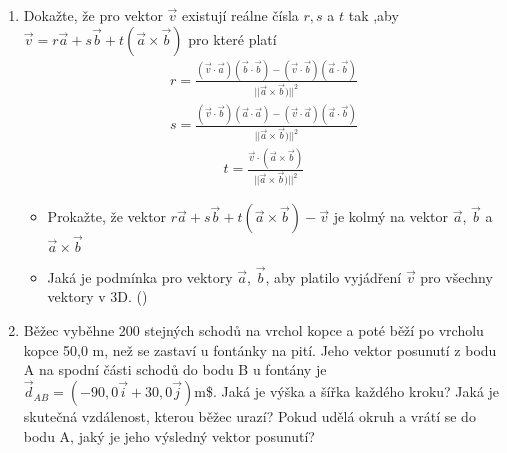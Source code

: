 \documentclass[letterpaper,10pt,english]{jupyterBook}
\begin{document}
{{\begin{enumerate}
\begin{itemize}
\end{itemize}

\item {} 
\sphinxAtStartPar
Dokažte, že pro vektor \(\vec{v}\) existují reálne čísla \(r,s\) a \(t\) tak ,aby \(\vec{v} = r \vec{a} + s \vec{b} + t (\vec{a}\times \vec{b})\) pro které platí
\begin{equation*}
\begin{split}r = \frac{(\vec{v}\cdot\vec{a})(\vec{b}\cdot\vec{b}) - (\vec{v}\cdot\vec{b})(\vec{a}\cdot\vec{b})}{||\vec{a}\times\vec{b}) ||^2}\end{split}
\end{equation*}\begin{equation*}
\begin{split}s = \frac{(\vec{v}\cdot\vec{b})(\vec{a}\cdot\vec{a}) - (\vec{v}\cdot\vec{a})(\vec{a}\cdot\vec{b})}{||\vec{a}\times\vec{b}) ||^2}\end{split}
\end{equation*}\begin{equation*}
\begin{split}t = \frac{\vec{v}\cdot(\vec{a}\times\vec{b})}{||\vec{a}\times\vec{b}) ||^2}\end{split}
\end{equation*}\begin{itemize}
\item {} 
\sphinxAtStartPar
Prokažte, že vektor \(r \vec{a} + s \vec{b} + t (\vec{a}\times \vec{b})- \vec{v}\) je kolmý na vektor \(\vec{a}\), \(\vec{b}\) a \(\vec{a}\times \vec{b}\)

\item {} 
\sphinxAtStartPar
Jaká je podmínka pro vektory \(\vec{a}\), \(\vec{b}\), aby platilo vyjádření \(\vec{v}\) pro všechny vektory v 3D.  ()

\end{itemize}

\item {} 
\sphinxAtStartPar
Běžec vyběhne 200 stejných schodů na vrchol kopce a poté běží po vrcholu kopce 50,0 m, než se zastaví u fontánky na pití. Jeho vektor posunutí z bodu A na spodní části schodů do bodu B u fontány je \(\vec{d}_{AB}= (-90,0\vec{i}+30,0\vec{j})\textrm{m}\)\$. Jaká je výška a šířka každého kroku? Jaká je skutečná vzdálenost, kterou běžec urazí? Pokud udělá okruh a vrátí se do bodu A, jaký je jeho výsledný vektor posunutí?


\end{enumerate}}}
\end{document}
